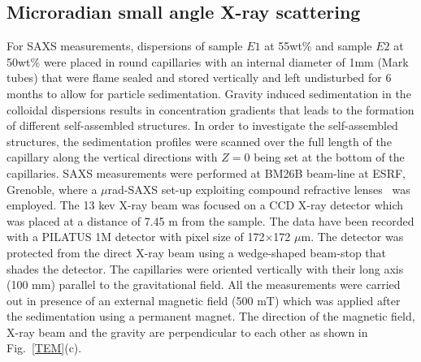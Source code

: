 \documentclass[aps,prl,preprint,superscriptaddress,showkeys]{revtex4-2} %
\begin{document}
\subsection{Microradian small angle X-ray scattering}
For SAXS measurements, dispersions of sample $E1$ at 55wt\% and sample $E2$ at 50wt\% were placed in round capillaries with an internal diameter of 1mm (Mark tubes) that were flame sealed and stored vertically and left undisturbed for 6 months to allow for particle sedimentation. Gravity induced sedimentation in the colloidal dispersions results in concentration gradients that leads to the formation of different self-assembled structures. In order to investigate the self-assembled structures, the sedimentation profiles were scanned over the full length of the capillary along the vertical directions with $Z=0$ being set at the bottom of the capillaries. SAXS measurements were performed at BM26B beam-line at ESRF, Grenoble, where a $\mu$rad-SAXS set-up exploiting compound refractive lenses~\cite{petukhov2015particle, snigirev1996compound} was employed. The 13 kev X-ray beam was focused on a CCD X-ray detector which was placed at a distance of 7.45 m from the sample. The data have been recorded with a PILATUS 1M detector with pixel size of 172$\times$172 $\mu$m. The detector was protected from the direct X-ray beam using a wedge-shaped beam-stop that shades the detector. The capillaries were oriented vertically with their long axis (100 mm) parallel to the gravitational field. All the measurements were carried out in presence of an external magnetic field (500 mT) which was applied after the sedimentation using a permanent magnet. The direction of the magnetic field, X-ray beam and the gravity are perpendicular to each other as shown in Fig.~\ref{TEM}(c).
\end{document}
